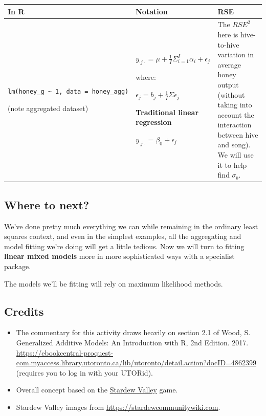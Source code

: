 \documentclass[
  openany]{book}
\providecommand{\tightlist}{%
  \setlength{\itemsep}{0pt}\setlength{\parskip}{0pt}}
\begin{document}
\begin{longtable}[]{@{}
  >{\raggedright\arraybackslash}p{}
  >{\raggedright\arraybackslash}p{}
  >{\raggedright\arraybackslash}p{}@{}}
\toprule
In R & Notation & RSE \\
\midrule
\endhead
\texttt{lm(honey\_g\ \textasciitilde{}\ 1,\ data\ =\ honey\_agg)}

(note aggregated dataset) & \(y_{\cdot j \cdot} = \mu + \frac{1}{I}\Sigma^I_{i = 1}\alpha_i + \epsilon_j\)

where:

\(\epsilon_j = b_j + \frac{1}{I}\Sigma\epsilon_j\)

\textbf{Traditional linear regression}

\(y_{\cdot j\cdot} = \beta_0 + \epsilon_{j}\) & The \(RSE^2\) here is hive-to-hive variation in average honey output (without taking into account the interaction between hive and song). We will use it to help find \(\sigma_{b}\). \\
\bottomrule
\end{longtable}

\hypertarget{where-to-next}{%
\subsection{Where to next?}\label{where-to-next}}

We've done pretty much everything we can while remaining in the ordinary least squares context, and even in the simplest examples, all the aggregating and model fitting we're doing will get a little tedious. Now we will turn to fitting \textbf{linear mixed models} more in more sophisticated ways with a specialist package.

The models we'll be fitting will rely on maximum likelihood methods.

\hypertarget{credits-1}{%
\subsection{Credits}\label{credits-1}}

\begin{itemize}
\tightlist
\item
  The commentary for this activity draws heavily on section 2.1 of
  Wood, S. Generalized Additive Models: An Introduction with R, 2nd Edition. 2017. \url{https://ebookcentral-proquest-com.myaccess.library.utoronto.ca/lib/utoronto/detail.action?docID=4862399} (requires you to log in with your UTORid).
\item
  Overall concept based on the \href{https://www.stardewvalley.net/}{Stardew Valley} game.
\item
  Stardew Valley images from \url{https://stardewcommunitywiki.com}.
\end{itemize}
\end{document}
